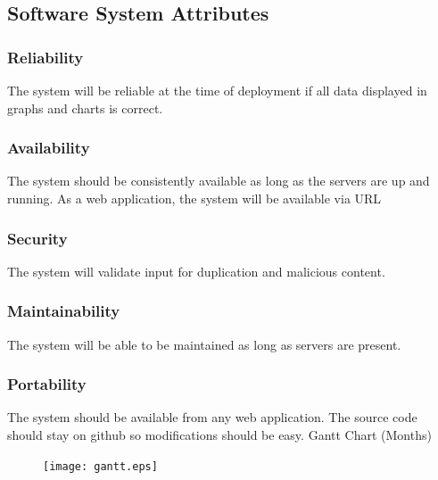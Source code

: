 \documentclass[onecolumn, draftclsnofoot,10pt, compsoc]{IEEEtran}
\begin{document}
    \subsection{Software System Attributes}
    
    \subsubsection{Reliability}
    The system will be reliable at the time of deployment if all data displayed in graphs and charts is correct.\\
    \subsubsection{Availability}
    The system should be consistently available as long as the servers are up and running. As a web application, the system will be available via URL 
    \subsubsection{Security}
    The system will validate input for duplication and malicious content.\\
    \subsubsection{Maintainability}
    The system will be able to be maintained as long as servers are present.
    \subsubsection{Portability}
    The system should be available from any web application. The source code should stay on github so modifications should be easy.
    Gantt Chart (Months)\\ 
    \begin{figure}[H]
        \centering
        \texttt{[image: gantt.eps]}
    \end{figure}

    
    
\end{document}
